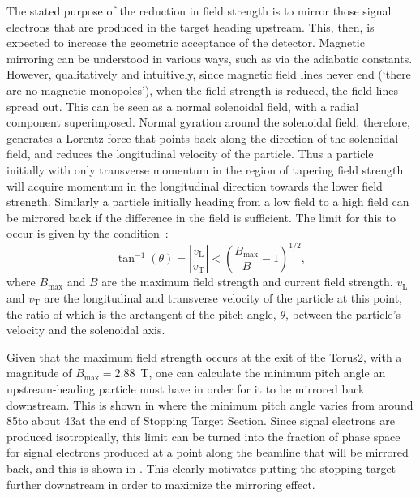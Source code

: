 The stated purpose of the reduction in field strength is to mirror those signal electrons that are produced in the target heading upstream.
This, then, is expected to increase the geometric acceptance of the detector.
Magnetic mirroring can be understood in various ways, such as via the adiabatic constants.
However, qualitatively and intuitively, since magnetic field lines never end (`there are no magnetic monopoles'), when the field strength is reduced, the field lines spread out.
This can be seen as a normal solenoidal field, with a radial component superimposed.
  Normal gyration around the solenoidal field, therefore, generates a Lorentz force that points back along the direction of the solenoidal field, and reduces the longitudinal velocity of the particle.
Thus a particle initially with only transverse momentum in the region of tapering field strength will acquire momentum in the longitudinal direction towards the lower field strength.
Similarly a particle initially heading from a low field to a high field can be mirrored back if the difference in the field is sufficient.
The limit for this to occur is given by the condition~\cite{Jackson}:
\begin{equation}
\tan^{-1}(\theta)=\left|\frac{v_\mathrm{L}}{v_\mathrm{T}}\right|<\left(\frac{B_\textrm{max}}{B}-1\right)^{1/2},
\end{equation}
where $B_\textrm{max}$ and $B$ are the maximum field strength and current field strength.
$v_\textrm{L}$ and $v_\textrm{T}$ are the longitudinal and transverse velocity of the particle at this point, the ratio of which is the arctangent of the pitch angle, $\theta$, between the particle's velocity and the solenoidal axis.

Given that the maximum field strength occurs at the exit of the Torus2, with a magnitude of $B_\textrm{max}=2.88$~T, one can calculate the minimum pitch angle an upstream-heading particle must have in order for it to be mirrored back downstream.
This is shown in  where the minimum pitch angle varies from around 85\degree to about 43\degree at the end of Stopping Target Section.
Since signal electrons are produced isotropically, this limit can be turned into the fraction of phase space for signal electrons produced at a point along the beamline that will be mirrored back, and this is shown in .
This clearly motivates putting the stopping target further downstream in order to maximize the mirroring effect.


